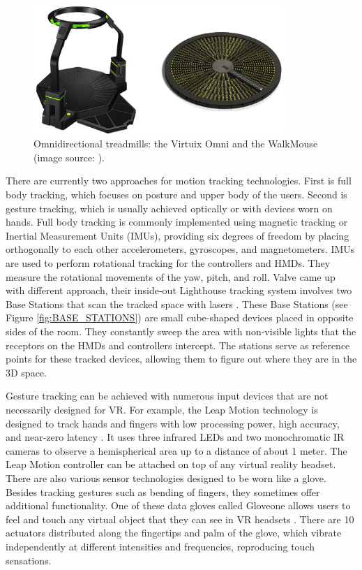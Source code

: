 \begin{figure}[th]
\centering
\includegraphics[width=0.85\textwidth]{img/vr_threadmills.png}
\caption{Omnidirectional treadmills: the Virtuix Omni and the WalkMouse (image source: \cite{VR_TECHNOLOGY}).}
\label{fig:VIRTUX_IMAGE}
\end{figure}

There are currently two approaches for motion tracking technologies. First is full body tracking, which focuses on posture and upper body of the users. Second is gesture tracking, which is usually achieved optically or with devices worn on hands. Full body tracking is commonly implemented using magnetic tracking or Inertial Measurement Units (IMUs), providing six degrees of freedom by placing orthogonally to each other accelerometers, gyroscopes, and magnetometers. IMUs are used to perform rotational tracking for the controllers and HMDs. They measure the rotational movements of the yaw, pitch, and roll. Valve came up with different approach, their inside-out Lighthouse tracking system involves two Base Stations that scan the tracked space with lasers \cite{VIVE}. These Base Stations (see Figure \ref{fig:BASE_STATIONS}) are small cube-shaped devices placed in opposite sides of the room. They constantly sweep the area with non-visible lights that the receptors on the HMDs and controllers intercept. The stations serve as reference points for these tracked devices, allowing them to figure out where they are in the 3D space. 

Gesture tracking can be achieved with numerous input devices that are not necessarily designed for VR. For example, the Leap Motion technology is designed to track hands and fingers with low processing power, high accuracy, and near-zero latency \cite{LEAP_MOTION}. It uses three infrared LEDs and two monochromatic IR cameras to observe a hemispherical area up to a distance of about 1 meter.  The Leap Motion controller can be attached on top of any virtual reality headset. There are also various sensor technologies designed to be worn like a glove. Besides tracking gestures such as bending of fingers, they sometimes offer additional functionality. One of these data gloves called  Gloveone allows users to feel and touch any virtual object that they can see in VR headsets \cite{GLOVEONE}. There are 10 actuators distributed along the fingertips and palm of the glove, which vibrate independently at different intensities and frequencies, reproducing touch sensations.

